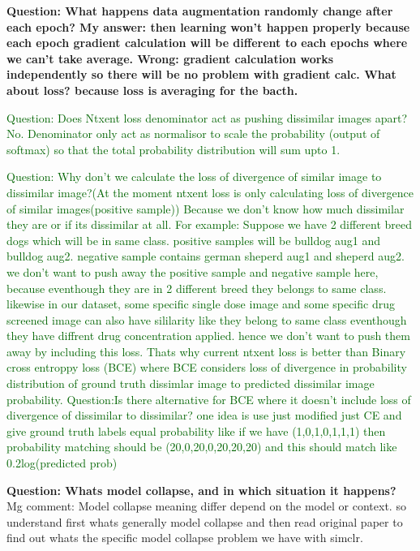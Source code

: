 \documentclass[12pt,twoside,a4paper,parskip]{scrbook} %
\begin{document}
\textbf{Question: What happens data augmentation randomly change after each epoch? My answer: then learning won't happen properly because each epoch gradient calculation will be different to each epochs where we can't take average. Wrong: gradient calculation works independently so there will be no problem with gradient calc. What about loss? because loss is averaging for the bacth.} 

\textcolor{darkgreen}{Question: Does Ntxent loss denominator act as pushing dissimilar images apart?}
\textcolor{darkgreen}{No. Denominator only act as normalisor to scale the probability (output of softmax) so that the total probability distribution will sum upto 1.} 

\textcolor{darkgreen}{Question: Why don’t we calculate the loss of divergence of similar image to dissimilar image?(At the moment ntxent loss is only calculating loss of divergence of similar images(positive sample))}
\textcolor{darkgreen}{Because we don’t know how much dissimilar they are or if its dissimilar at all. For example: Suppose we have 2 different breed dogs which will be in same class. positive samples will be bulldog aug1 and bulldog aug2. negative sample contains german sheperd aug1 and sheperd aug2. we don't want to push away the positive sample and negative sample here, because eventhough they are in 2 different breed they belongs to same class. likewise in our dataset, some specific single dose image and some specific drug screened image can also have sililarity like they belong to same class eventhough they have diffrent drug concentration applied. hence we don't want to push them away by including this loss.
Thats why current ntxent loss is better than Binary cross entroppy loss (BCE) where BCE considers loss of divergence in probability distribution of ground truth dissimlar image to predicted dissimilar image probability.}
\textcolor{darkgreen}{Question:Is there alternative for BCE where it doesn't include loss of divergence of dissimilar to dissimilar? one idea is use just modified just CE and give ground truth labels equal probability like if we have (1,0,1,0,1,1,1) then probability matching should be (20,0,20,0,20,20,20) and this should match like 0.2log(predicted prob)}

\textbf{Question: Whats model collapse, and in which situation it happens?}
Mg comment: Model collapse meaning differ depend on the model or context. so understand first whats generally model collapse and then read original paper to find out whats the specific model collapse problem we have with simclr.
\end{document}
